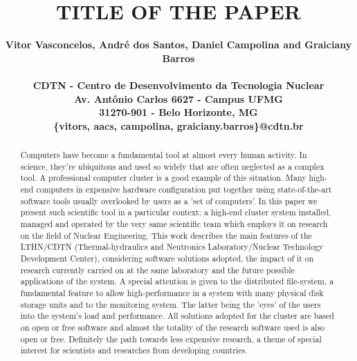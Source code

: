 \documentclass[twoside,a4paper,12pt,english]{inac19_abstract}
\title{TITLE OF THE PAPER}
\author{
  \bf{Vitor Vasconcelos, Andr\'e dos Santos, Daniel Campolina and Graiciany Barros}\\ \\
  CDTN - Centro de Desenvolvimento da Tecnologia Nuclear\\
  Av. Ant\^onio Carlos 6627 - Campus UFMG\\
  31270-901 - Belo Horizonte, MG\\
  \{vitors, aacs, campolina, graiciany.barros\}@cdtn.br}
\begin{document}
\maketitle

\pagestyle{myheadings}
\thispagestyle{empty}
\markboth{}{}


\thispagestyle{empty}


\begin{abstract}
Computers have become a fundamental tool at almost every human activity.
In science, they're ubiquitous and used so widely that are often neglected
as a complex tool. A professional computer cluster is a good example of
this situation. Many high-end computers in expensive hardware configuration
put together using state-of-the-art software tools usually overlooked by
users as a 'set of computers'. In this paper we present such scientific tool
in a particular context: a high-end cluster system installed, managed and operated
by the very same scientific team which employs it on research on the field of Nuclear Engineering.
This work describes the main features of the LTHN/CDTN (Thermal-hydraulics and Neutronics
Laboratory/Nuclear Technology Development Center), considering software solutions
adopted, the impact of it on research currently carried on at the same laboratory
and the future possible applications of the system. A special attention is given to
the distributed file-system, a fundamental feature to allow high-performance in a system
with many physical disk storage units and to the monitoring system. The latter being
the 'eyes' of the users into the system's load and performance. All solutions adopted for the
cluster are based on open or free software and almost the totality of the research
software used is also open or free. Definitely the path towards less expensive
research, a theme of special interest for scientists and researches from developing countries.
\end{abstract}

\end{document}
